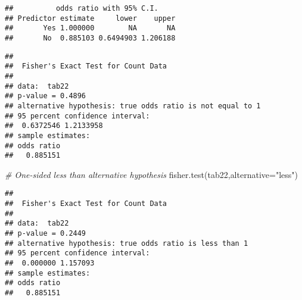 \documentclass[
]{article}
\newenvironment{Shaded}{\begin{snugshade}}{\end{snugshade}}
\newcommand{\AttributeTok}[1]{\textcolor[rgb]{0.77,0.63,0.00}{#1}}
\newcommand{\CommentTok}[1]{\textcolor[rgb]{0.56,0.35,0.01}{\textit{#1}}}
\newcommand{\FunctionTok}[1]{\textcolor[rgb]{0.00,0.00,0.00}{#1}}
\newcommand{\NormalTok}[1]{#1}
\newcommand{\OtherTok}[1]{\textcolor[rgb]{0.56,0.35,0.01}{#1}}
\newcommand{\SpecialCharTok}[1]{\textcolor[rgb]{0.00,0.00,0.00}{#1}}
\newcommand{\StringTok}[1]{\textcolor[rgb]{0.31,0.60,0.02}{#1}}
\begin{document}
\begin{Shaded}
\end{Shaded}

\begin{verbatim}
##          odds ratio with 95% C.I.
## Predictor estimate     lower    upper
##       Yes 1.000000        NA       NA
##       No  0.885103 0.6494903 1.206188
\end{verbatim}

\begin{Shaded}
\end{Shaded}

\begin{verbatim}
## 
##  Fisher's Exact Test for Count Data
## 
## data:  tab22
## p-value = 0.4896
## alternative hypothesis: true odds ratio is not equal to 1
## 95 percent confidence interval:
##  0.6372546 1.2133958
## sample estimates:
## odds ratio 
##   0.885151
\end{verbatim}

\begin{Shaded}
\begin{Highlighting}[]
\CommentTok{\# One{-}sided less than alternative hypothesis}
\FunctionTok{fisher.test}\NormalTok{(tab22,}\AttributeTok{alternative=}\StringTok{"less"}\NormalTok{)}
\end{Highlighting}
\end{Shaded}

\begin{verbatim}
## 
##  Fisher's Exact Test for Count Data
## 
## data:  tab22
## p-value = 0.2449
## alternative hypothesis: true odds ratio is less than 1
## 95 percent confidence interval:
##  0.000000 1.157093
## sample estimates:
## odds ratio 
##   0.885151
\end{verbatim}
\end{document}
